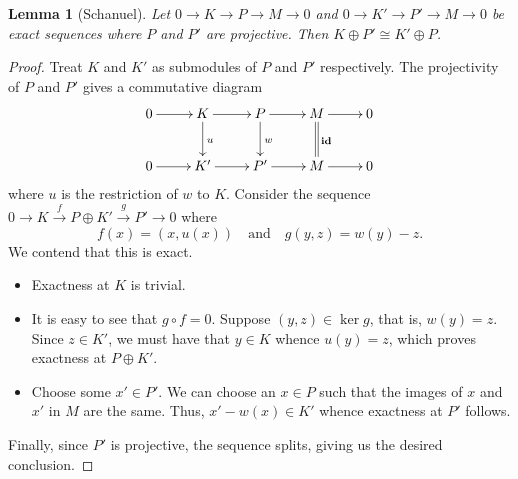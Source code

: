 \documentclass[12pt]{article}
\theoremstyle{thmstyle}
\newtheorem{lemma}[theorem]{Lemma}
\theoremstyle{defstyle}
\newcommand{\id}{\mathbf{id}}
\begin{document}
\begin{lemma}[Schanuel]
    Let $0\to K\to P\to M\to 0$ and $0\to K'\to P'\to M\to 0$ be exact sequences where $P$ and $P'$ are projective. Then $K\oplus P'\cong K'\oplus P$.
\end{lemma}
\begin{proof}
    Treat $K$ and $K'$ as submodules of $P$ and $P'$ respectively. The projectivity of $P$ and $P'$ gives a commutative diagram 
    \begin{equation*}
        \xymatrix {
            0\ar[r] & K\ar[r]\ar[d]^u & P\ar[r]\ar[d]^w & M\ar[r]\ar@{=}[d]^{\id} & 0\\
            0\ar[r] & K'\ar[r] & P'\ar[r] & M\ar[r] & 0
        }
    \end{equation*}
    where $u$ is the restriction of $w$ to $K$. Consider the sequence $0\to K\xrightarrow{f} P\oplus K'\xrightarrow{g} P'\to 0$ where 
    \begin{equation*}
        f(x) = (x, u(x))\quad\text{and}\quad g(y, z) = w(y) - z.
    \end{equation*}
    We contend that this is exact. 
    \begin{itemize}
        \item Exactness at $K$ is trivial. 
        \item It is easy to see that $g\circ f = 0$. Suppose $(y, z)\in\ker g$, that is, $w(y) = z$. Since $z\in K'$, we must have that $y\in K$ whence $u(y) = z$, which proves exactness at $P\oplus K'$.
        \item Choose some $x'\in P'$. We can choose an $x\in P$ such that the images of $x$ and $x'$ in $M$ are the same. Thus, $x' - w(x)\in K'$ whence exactness at $P'$ follows.
    \end{itemize}
    Finally, since $P'$ is projective, the sequence splits, giving us the desired conclusion.
\end{proof}
\end{document}
